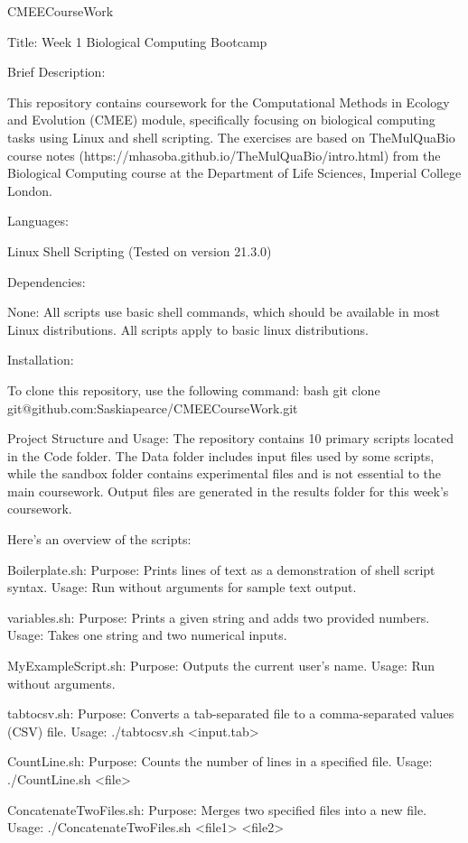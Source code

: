 CMEECourseWork

Title: Week 1 Biological Computing Bootcamp

Brief Description:

This repository contains coursework for the Computational Methods in Ecology and Evolution (CMEE) module, specifically focusing on biological computing tasks using Linux and shell scripting. The exercises are based on TheMulQuaBio course notes (https://mhasoba.github.io/TheMulQuaBio/intro.html) from the Biological Computing course at the Department of Life Sciences, Imperial College London.

Languages:

Linux Shell Scripting (Tested on version 21.3.0)

Dependencies:

None: All scripts use basic shell commands, which should be available in most Linux distributions. All scripts apply to basic linux distributions. 

Installation:

To clone this repository, use the following command: bash git clone git@github.com:Saskiapearce/CMEECourseWork.git

Project Structure and Usage: The repository contains 10 primary scripts located in the Code folder. The Data folder includes input files used by some scripts, while the sandbox folder contains experimental files and is not essential to the main coursework. Output files are generated in the results folder for this week’s coursework.

Here’s an overview of the scripts:

Boilerplate.sh:
    Purpose: Prints lines of text as a demonstration of shell script syntax.
    Usage: Run without arguments for sample text output.

variables.sh:
    Purpose: Prints a given string and adds two provided numbers.
    Usage: Takes one string and two numerical inputs.

MyExampleScript.sh:
    Purpose: Outputs the current user's name.
    Usage: Run without arguments.

tabtocsv.sh:
    Purpose: Converts a tab-separated file to a comma-separated values (CSV) file.
    Usage: ./tabtocsv.sh <input.tab>

CountLine.sh:
    Purpose: Counts the number of lines in a specified file.
    Usage: ./CountLine.sh <file>

ConcatenateTwoFiles.sh:
    Purpose: Merges two specified files into a new file.
    Usage: ./ConcatenateTwoFiles.sh <file1> <file2>


